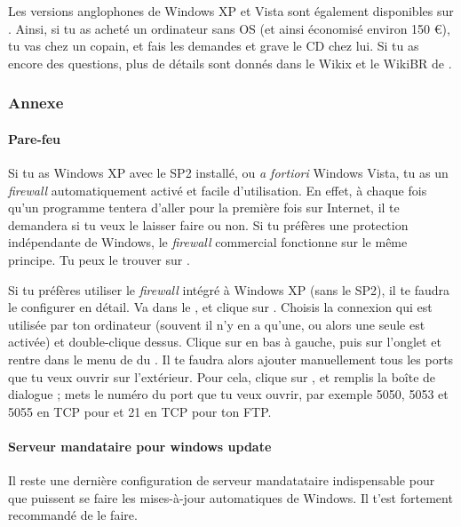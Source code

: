 Les versions anglophones de Windows XP et Vista sont également disponibles sur .
Ainsi, si tu as acheté un ordinateur sans OS (et ainsi économisé environ 150 \euro), tu vas chez un copain, et fais les demandes et grave le CD chez lui. Si tu as encore des questions, plus de détails sont donnés dans le Wikix et le WikiBR de \fkz.


\subsubsection{Annexe}

\label{horsdomaine} %

\paragraph{Pare-feu} Si tu as Windows XP avec le SP2 installé, ou \emph{a fortiori}
Windows Vista, tu as un \emph{firewall} automatiquement activé et facile d'utilisation. En effet, à chaque fois qu'un programme tentera d'aller pour
la première fois sur Internet, il te demandera si tu veux le laisser faire ou non. Si tu préfères une protection indépendante de Windows, le
\emph{firewall} commercial  fonctionne sur le même principe. Tu peux le trouver sur \xshare.

Si tu préfères utiliser le \emph{firewall} intégré à Windows XP (sans le SP2), il te faudra le configurer en détail. Va dans le ,
 et clique sur . Choisis la connexion qui est utilisée par ton ordinateur (souvent il n'y en a qu'une, ou
alors une seule est activée) et double-clique dessus. Clique sur  en bas à gauche, puis sur l'onglet  et rentre dans le
menu de  du . Il te faudra alors ajouter manuellement tous les ports que tu veux ouvrir sur l'extérieur. Pour
cela, clique sur , et remplis la boîte de dialogue%
; mets le numéro du port que tu veux ouvrir, par exemple 5050, 5053 et 5055 en TCP pour  et 21 en TCP pour ton FTP.

\paragraph{Serveur mandataire pour windows update} Il reste une dernière configuration de
serveur mandatataire indispensable pour que puissent se faire les mises-à-jour automatiques
de Windows. Il t'est fortement recommandé de le faire.

